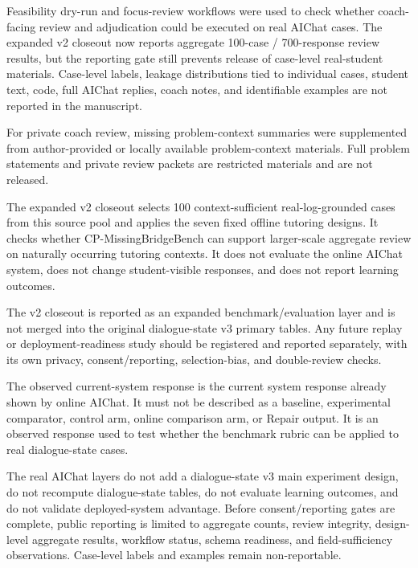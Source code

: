 \documentclass[11pt]{article}
\begin{document}
Feasibility dry-run and focus-review workflows were used to check whether coach-facing review and adjudication could be executed on real AIChat cases. The expanded v2 closeout now reports aggregate 100-case / 700-response review results, but the reporting gate still prevents release of case-level real-student materials. Case-level labels, leakage distributions tied to individual cases, student text, code, full AIChat replies, coach notes, and identifiable examples are not reported in the manuscript.

For private coach review, missing problem-context summaries were supplemented from author-provided or locally available problem-context materials. Full problem statements and private review packets are restricted materials and are not released.

The expanded v2 closeout selects 100 context-sufficient real-log-grounded cases from this source pool and applies the seven fixed offline tutoring designs. It checks whether CP-MissingBridgeBench can support larger-scale aggregate review on naturally occurring tutoring contexts. It does not evaluate the online AIChat system, does not change student-visible responses, and does not report learning outcomes.

The v2 closeout is reported as an expanded benchmark/evaluation layer and is not merged into the original dialogue-state v3 primary tables. Any future replay or deployment-readiness study should be registered and reported separately, with its own privacy, consent/reporting, selection-bias, and double-review checks.

The observed current-system response is the current system response already shown by online AIChat. It must not be described as a baseline, experimental comparator, control arm, online comparison arm, or Repair output. It is an observed response used to test whether the benchmark rubric can be applied to real dialogue-state cases.

The real AIChat layers do not add a dialogue-state v3 main experiment design, do not recompute dialogue-state tables, do not evaluate learning outcomes, and do not validate deployed-system advantage. Before consent/reporting gates are complete, public reporting is limited to aggregate counts, review integrity, design-level aggregate results, workflow status, schema readiness, and field-sufficiency observations. Case-level labels and examples remain non-reportable.



\end{document}
